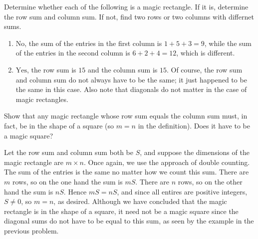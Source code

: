 \documentclass[11pt]{article}
\renewenvironment{problem}{\begin{problems}}{\end{problems}\vspace{5pt}}
\begin{document}
\setcounter{subfigure}{0}
\begin{problem}[4=2+2 points]
Determine whether each of the following is a magic rectangle. If it is, determine the row sum and column sum.
If not, find two rows or two columns with differnet sums.
\begin{figure}[H]
\centering
{} \qquad \qquad
{}
\end{figure}
\end{problem}

\begin{solution}
\begin{enumerate}[label=(\alph*)]
\item $\boxed{\text{No}}$, the sum of the entries in the first column is $1+5+3=9$, while
the sum of the entries in the second column is $6+2+4 = 12$, which is different.

\item $\boxed{\text{Yes}}$, the row sum is $15$ and the column sum is $15$. Of course, the row sum
and column sum do not always have to be the same; it just happened to be the same in this case.
Also note that diagonals do not matter in the case of magic rectangles.
\end{enumerate}
\end{solution}


\begin{problem}[4 points]
Show that any magic rectangle whose row sum equals the column sum must, in fact, be in the shape of a square
(so $m = n$ in the definition). Does it have to be a magic square?
\end{problem}

\begin{solution}
Let the row sum and column sum both be $S$, and suppose the dimensions of the magic rectangle are $m \times n$. 
Once again, we use the approach of double counting.  The sum of the entries is the same no matter how we count this sum.
There are $m$ rows, so on the one hand the sum is $mS$. There are $n$ rows, so on the other hand the sum is $nS$.
Hence $mS = nS$, and since all entires are positive integers, $S \ne 0$, so $m = n$, as desired.
Although we have concluded that the magic rectangle is in the shape of a square, it need not be a magic
square since the diagonal sums do not have to be equal to this sum, as seen by the example in the previous problem.  
\end{solution}
\end{document}
